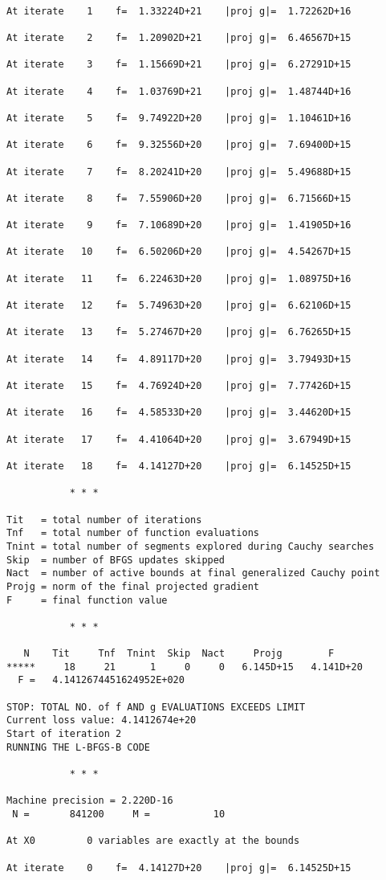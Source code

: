 \documentclass[11pt]{article}
\begin{document}
    \begin{Verbatim}[commandchars=\\\{\}]

At iterate    1    f=  1.33224D+21    |proj g|=  1.72262D+16

At iterate    2    f=  1.20902D+21    |proj g|=  6.46567D+15

At iterate    3    f=  1.15669D+21    |proj g|=  6.27291D+15

At iterate    4    f=  1.03769D+21    |proj g|=  1.48744D+16

At iterate    5    f=  9.74922D+20    |proj g|=  1.10461D+16

At iterate    6    f=  9.32556D+20    |proj g|=  7.69400D+15

At iterate    7    f=  8.20241D+20    |proj g|=  5.49688D+15

At iterate    8    f=  7.55906D+20    |proj g|=  6.71566D+15

At iterate    9    f=  7.10689D+20    |proj g|=  1.41905D+16

At iterate   10    f=  6.50206D+20    |proj g|=  4.54267D+15

At iterate   11    f=  6.22463D+20    |proj g|=  1.08975D+16

At iterate   12    f=  5.74963D+20    |proj g|=  6.62106D+15

At iterate   13    f=  5.27467D+20    |proj g|=  6.76265D+15

At iterate   14    f=  4.89117D+20    |proj g|=  3.79493D+15

At iterate   15    f=  4.76924D+20    |proj g|=  7.77426D+15

At iterate   16    f=  4.58533D+20    |proj g|=  3.44620D+15

At iterate   17    f=  4.41064D+20    |proj g|=  3.67949D+15

At iterate   18    f=  4.14127D+20    |proj g|=  6.14525D+15

           * * *

Tit   = total number of iterations
Tnf   = total number of function evaluations
Tnint = total number of segments explored during Cauchy searches
Skip  = number of BFGS updates skipped
Nact  = number of active bounds at final generalized Cauchy point
Projg = norm of the final projected gradient
F     = final function value

           * * *

   N    Tit     Tnf  Tnint  Skip  Nact     Projg        F
*****     18     21      1     0     0   6.145D+15   4.141D+20
  F =   4.1412674451624952E+020

STOP: TOTAL NO. of f AND g EVALUATIONS EXCEEDS LIMIT
Current loss value: 4.1412674e+20
Start of iteration 2
RUNNING THE L-BFGS-B CODE

           * * *

Machine precision = 2.220D-16
 N =       841200     M =           10

At X0         0 variables are exactly at the bounds

At iterate    0    f=  4.14127D+20    |proj g|=  6.14525D+15
    \end{Verbatim}
\end{document}
